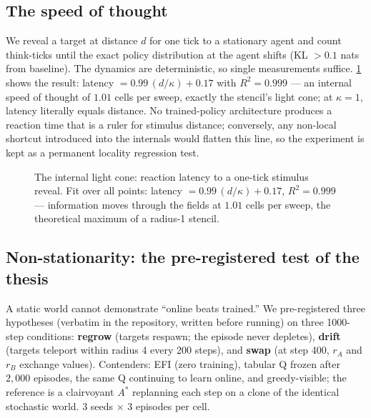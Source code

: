\documentclass[11pt]{article}
\begin{document}
\subsection{The speed of thought}
\label{sec:lightcone}
We reveal a target at distance $d$ for one tick to a stationary agent and count think-ticks until the exact policy distribution at the agent shifts (KL $>0.1$ nats from baseline). The dynamics are deterministic, so single measurements suffice. \cref{fig:lightcone} shows the result: latency $= 0.99\,(d/\kappa) + 0.17$ with $R^2 = 0.999$ --- an internal speed of thought of $1.01$ cells per sweep, exactly the stencil's light cone; at $\kappa{=}1$, latency literally equals distance. No trained-policy architecture produces a reaction time that is a ruler for stimulus distance; conversely, any non-local shortcut introduced into the internals would flatten this line, so the experiment is kept as a permanent locality regression test.

\begin{figure}[t]
\centering
{}
\caption{The internal light cone: reaction latency to a one-tick stimulus reveal. Fit over all points: latency $=0.99\,(d/\kappa)+0.17$, $R^2=0.999$ --- information moves through the fields at $1.01$ cells per sweep, the theoretical maximum of a radius-1 stencil.}
\label{fig:lightcone}
\end{figure}

\subsection{Non-stationarity: the pre-registered test of the thesis}
\label{sec:nonstat}
A static world cannot demonstrate ``online beats trained.'' We pre-registered three hypotheses (verbatim in the repository, written before running) on three 1000-step conditions: \textbf{regrow} (targets respawn; the episode never depletes), \textbf{drift} (targets teleport within radius 4 every 200 steps), and \textbf{swap} (at step 400, $r_A$ and $r_B$ exchange values). Contenders: EFI (zero training), tabular Q frozen after $2{,}000$ episodes, the same Q continuing to learn online, and greedy-visible; the reference is a clairvoyant $A^\ast$ replanning each step on a clone of the identical stochastic world. 3 seeds $\times$ 3 episodes per cell.
\end{document}
